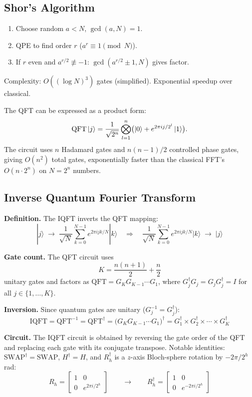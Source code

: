 \documentclass[10pt,a4paper]{article}
\begin{document}
\subsection{Shor's Algorithm}

\begin{tcolorbox}[algostyle, title={Algorithm}]
\begin{enumerate}[nosep]
\item Choose random $a<N$, $\gcd(a,N)=1$.
\item QPE to find order $r$ ($a^r\equiv 1\pmod{N}$).
\item If $r$ even and $a^{r/2}\not\equiv -1$: $\gcd(a^{r/2}\pm 1,N)$ gives factor.
\end{enumerate}
Complexity: $O((\log N)^3)$ gates (simplified). Exponential speedup over classical.
\end{tcolorbox}

The QFT can be expressed as a product form:
\[
\mathrm{QFT}\ket{j}=\frac{1}{\sqrt{2^n}}\bigotimes_{l=1}^{n}\bigl(\ket{0}+e^{2\pi ij/2^l}\ket{1}\bigr).
\]
The circuit uses $n$ Hadamard gates and $n(n-1)/2$ controlled phase gates, giving $O(n^2)$ total gates, exponentially faster than the classical FFT's $O(n\cdot 2^n)$ on $N=2^n$ numbers.

\subsection{Inverse Quantum Fourier Transform}

\textbf{Definition.} The IQFT inverts the QFT mapping:
\[
  |j\rangle \;\rightarrow\; \frac{1}{\sqrt{N}}\sum_{k=0}^{N-1}e^{2\pi ijk/N}|k\rangle
  \quad\Longrightarrow\quad
  \frac{1}{\sqrt{N}}\sum_{k=0}^{N-1}e^{2\pi ijk/N}|k\rangle \;\rightarrow\; |j\rangle
\]

\textbf{Gate count.} The QFT circuit uses
\[
  K = \frac{n(n+1)}{2} + \frac{n}{2}
\]
unitary gates and factors as $\mathrm{QFT} = G_K G_{K-1}\cdots G_1$,
where $G_j^\dagger G_j = G_j G_j^\dagger = I$ for all $j\in\{1,\dots,K\}$.

\textbf{Inversion.} Since quantum gates are unitary ($G_j^{-1}=G_j^\dagger$):
\[
  \mathrm{IQFT} = \mathrm{QFT}^{-1} = \mathrm{QFT}^\dagger
  = \bigl(G_K G_{K-1}\cdots G_1\bigr)^\dagger
  = G_1^\dagger \times G_2^\dagger \times\cdots\times G_K^\dagger
\]

\textbf{Circuit.} The IQFT circuit is obtained by reversing the gate order
of the QFT and replacing each gate with its conjugate transpose.
Notable identities: $\mathrm{SWAP}^\dagger=\mathrm{SWAP}$, $H^\dagger=H$, and
$R_h^\dagger$ is a $z$-axis Bloch-sphere rotation by $-2\pi/2^h$ rad:
\[
  R_h = \begin{bmatrix} 1 & 0 \\ 0 & e^{2\pi i/2^h} \end{bmatrix}
  \qquad\longrightarrow\qquad
  R_h^\dagger = \begin{bmatrix} 1 & 0 \\ 0 & e^{-2\pi i/2^h} \end{bmatrix}
\]
\end{document}
